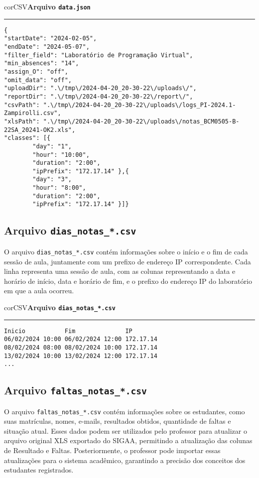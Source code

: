\begin{myboxCode}{corCSV}{\textbf{Arquivo \texttt{data.json}}}\vspace{3mm}
\hrule
\begin{verbatim}
{
"startDate": "2024-02-05",
"endDate": "2024-05-07",
"filter_field": "Laboratório de Programação Virtual",
"min_absences": "14",
"assign_O": "off",
"omit_data": "off",
"uploadDir": ".\/tmp\/2024-04-20_20-30-22\/uploads\/",
"reportDir": ".\/tmp\/2024-04-20_20-30-22\/report\/",
"csvPath": ".\/tmp\/2024-04-20_20-30-22\/uploads\/logs_PI-2024.1-Zampirolli.csv",
"xlsPath": ".\/tmp\/2024-04-20_20-30-22\/uploads\/notas_BCM0505-B-22SA_20241-OK2.xls",
"classes": [{
        "day": "1",
        "hour": "10:00",
        "duration": "2:00",
        "ipPrefix": "172.17.14" },{
        "day": "3",
        "hour": "8:00",
        "duration": "2:00",
        "ipPrefix": "172.17.14" }]}
\end{verbatim}
\end{myboxCode}

\subsection{Arquivo \texttt{dias\_notas\_*.csv}}

O arquivo \texttt{dias\_notas\_*.csv} contém informações sobre o início e o fim de cada sessão de aula, juntamente com um prefixo de endereço IP correspondente. Cada linha representa uma sessão de aula, com as colunas representando a data e horário de início, data e horário de fim, e o prefixo do endereço IP do laboratório em que a aula ocorreu.

\begin{myboxCode}{corCSV}{\textbf{Arquivo \texttt{dias\_notas\_*.csv}}}\vspace{3mm}
    \hrule
    \begin{verbatim}
Inicio           Fim              IP
06/02/2024 10:00 06/02/2024 12:00 172.17.14
08/02/2024 08:00 08/02/2024 10:00 172.17.14
13/02/2024 10:00 13/02/2024 12:00 172.17.14
...
\end{verbatim}
\end{myboxCode}

\subsection{Arquivo \texttt{faltas\_notas\_*.csv}}

O arquivo \texttt{faltas\_notas\_*.csv} contém informações sobre os estudantes, como suas matrículas, nomes, e-mails, resultados obtidos, quantidade de faltas e situação atual. Esses dados podem ser utilizados pelo professor para atualizar o arquivo original XLS exportado do SIGAA, permitindo a atualização das colunas de Resultado e Faltas. Posteriormente, o professor pode importar essas atualizações para o sistema acadêmico, garantindo a precisão dos conceitos dos estudantes registrados.

